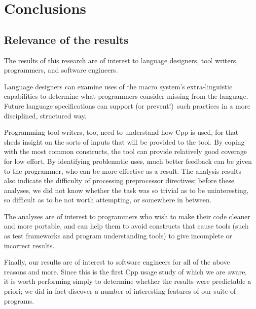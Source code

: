 \documentclass[11pt]{article}
\begin{document}
\section{Conclusions}
\label{sec:conclusion}

\subsection{Relevance of the results}

The results of this research are of interest to language designers, tool
writers, programmers, and software engineers.

Language designers can examine uses of the macro system's extra-linguistic
capabilities to determine what programmers consider missing from the
language.  Future language specifications can support (or prevent!)\ such
practices in a more disciplined, structured way.


Programming tool writers, too, need to understand how Cpp is used, for that
sheds insight on the sorts of inputs that will be provided to the tool.  By
coping with the most common constructs, the tool can provide relatively
good coverage for low effort.  By identifying problematic uses, much better
feedback can be given to the programmer, who can be more effective as a
result.  The analysis results also indicate the difficulty of processing
preprocessor directives; before these analyses, we did not know whether the
task was so trivial as to be uninteresting, so difficult as to be not worth
attempting, or somewhere in between.

The analyses are of interest to programmers who wish to make their code
cleaner and more portable, and can help them to avoid constructs that cause
tools (such as test frameworks and program understanding tools)
to give incomplete or incorrect results.


Finally, our results are of interest to software engineers for all of the
above reasons and more.  Since this is the first Cpp usage study of which
we are aware, it is worth performing simply to determine whether the
results were predictable a priori; we did in fact discover a number of
interesting features of our suite of programs.
\end{document}
